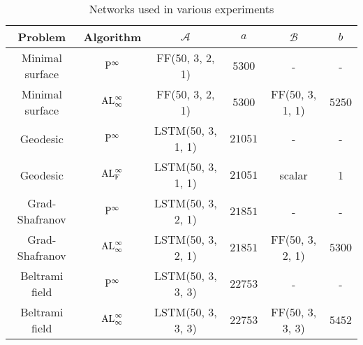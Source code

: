 \begin{table}[!ht]
\begin{center}
\begin{tabular}{ |c|c|c|c|c|c| }   \hline
    Problem & Algorithm  &$\mathcal A$ &  $a$&  $\mathcal B$&  $b$ \\ 
    \hline
    Minimal surface&${\rm P}^\infty$ &  FF(50, 3, 2, 1) & $5300$  &-  &  -\\
    \hline
    Minimal surface &${\rm AL}^\infty_\infty$ &  FF(50, 3, 2, 1) & $5300$  &FF(50, 3, 1, 1)  &  $5250$\\
    \hline
    Geodesic&${\rm P}^\infty$ &  LSTM(50, 3, 1, 1) & $21051$  &- &  - \\
    \hline
    Geodesic &${\rm AL}^\infty_{\rm F}$ &  LSTM(50, 3, 1, 1) & $21051$  & scalar  &  1\\
    \hline
   Grad-Shafranov &${\rm P}^\infty$ &  LSTM(50, 3, 2, 1) & $21851$  &-&  -\\
    \hline
    Grad-Shafranov & ${\rm AL}^\infty_\infty$ &  LSTM(50, 3, 2, 1) & $21851$  & FF(50, 3, 2, 1) &  $5300$\\
    \hline
    Beltrami field& ${\rm P}^\infty$ &  LSTM(50, 3, 3, 3) & $22753$  &- &  -\\
    \hline
    Beltrami field &${\rm AL}^\infty_\infty$ &  LSTM(50, 3, 3, 3) & $22753$  &FF(50, 3, 3, 3)  &  $5452$\\
    \hline
\end{tabular}
\caption{Networks used in various experiments}
\label{tab:network--var-ml}
\end{center}
\end{table}
